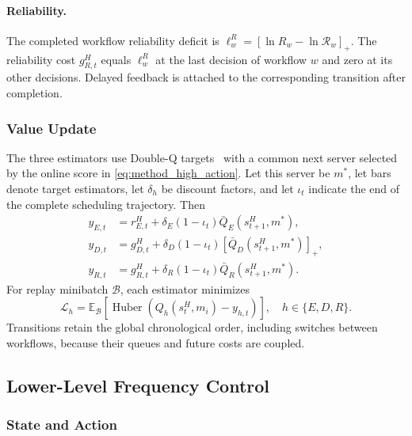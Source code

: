 \documentclass[lettersize,journal]{IEEEtran}
\begin{document}
\paragraph{Reliability.}
The completed workflow reliability deficit is
$\ell_w^R=[\ln R_w-\ln\mathcal R_w]_+$.
The reliability cost $g_{R,t}^H$ equals $\ell_w^R$ at the last decision
of workflow $w$ and zero at its other decisions. Delayed feedback is
attached to the corresponding transition after completion.

\subsubsection{Value Update}

The three estimators use Double-Q targets~\cite{vanhasselt2016} with a
common next server selected by the online score in
\eqref{eq:method_high_action}. Let this server be $m^*$, let bars denote
target estimators, let $\delta_h$ be discount factors, and let $\iota_t$
indicate the end of the complete scheduling trajectory. Then
\begin{align}
 y_{E,t}&=r_{E,t}^H+\delta_E(1-\iota_t)\bar Q_E(s_{t+1}^H,m^*),\nonumber\\
 y_{D,t}&=g_{D,t}^H+\delta_D(1-\iota_t)[\bar Q_D(s_{t+1}^H,m^*)]_+,\nonumber\\
 y_{R,t}&=g_{R,t}^H+\delta_R(1-\iota_t)\bar Q_R(s_{t+1}^H,m^*).
 \label{eq:method_high_targets}
\end{align}
For replay minibatch $\mathcal B$, each estimator minimizes
\begin{equation}
 \mathcal L_h=\mathbb E_{\mathcal B}\left[
 \operatorname{Huber}\!\left(Q_h(s_t^H,m_i)-y_{h,t}\right)\right],
 \quad h\in\{E,D,R\}.
 \label{eq:method_high_loss}
\end{equation}
Transitions retain the
global chronological order, including switches between workflows,
because their queues and future costs are coupled.

\subsection{Lower-Level Frequency Control}
\label{subsec:low}

\subsubsection{State and Action}
\end{document}
